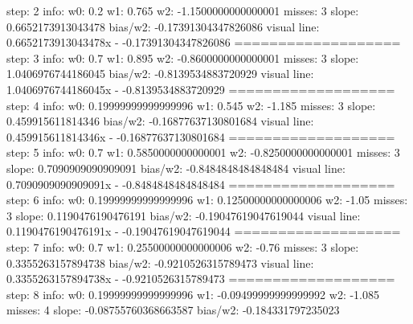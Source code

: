 \documentclass[11pt]{article}
\begin{document}
\begin{enumerate}
step: 2 info: w0: 0.2 w1: 0.765 w2: -1.1500000000000001 misses: 3 \newline
		slope: 0.6652173913043478 bias/w2: -0.17391304347826086 \newline
	visual line: 0.6652173913043478x - -0.17391304347826086 \newline
=================== \newline
step: 3 info: w0: 0.7 w1: 0.895 w2: -0.8600000000000001 misses: 3 \newline
		slope: 1.0406976744186045 bias/w2: -0.8139534883720929 \newline
	visual line: 1.0406976744186045x - -0.8139534883720929 \newline
=================== \newline
step: 4 info: w0: 0.19999999999999996 w1: 0.545 w2: -1.185 misses: 3 \newline
		slope: 0.459915611814346 bias/w2: -0.16877637130801684 \newline
	visual line: 0.459915611814346x - -0.16877637130801684 \newline
=================== \newline
step: 5 info: w0: 0.7 w1: 0.5850000000000001 w2: -0.8250000000000001 misses: 3 \newline
		slope: 0.7090909090909091 bias/w2: -0.8484848484848484 \newline
	visual line: 0.7090909090909091x - -0.8484848484848484 \newline
=================== \newline
step: 6 info: w0: 0.19999999999999996 w1: 0.12500000000000006 w2: -1.05 misses: 3 \newline
		slope: 0.1190476190476191 bias/w2: -0.19047619047619044 \newline
	visual line: 0.1190476190476191x - -0.19047619047619044 \newline
=================== \newline
step: 7 info: w0: 0.7 w1: 0.25500000000000006 w2: -0.76 misses: 3 \newline
		slope: 0.3355263157894738 bias/w2: -0.9210526315789473 \newline
	visual line: 0.3355263157894738x - -0.9210526315789473 \newline
=================== \newline
step: 8 info: w0: 0.19999999999999996 w1: -0.09499999999999992 w2: -1.085 misses: 4 \newline
		slope: -0.08755760368663587 bias/w2: -0.184331797235023 \newline

\end{enumerate}
\end{document}
